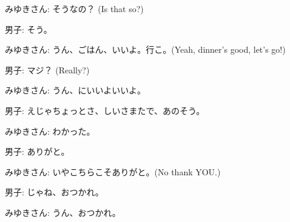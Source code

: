 \documentclass[../nihongo-gakushuu-kyouzai-grammar.tex]{subfiles}
\begin{document}
\begin{itemize}
    みゆきさん: そうなの？ (Is that so?)

    男子: そう。

    みゆきさん: うん、ごはん、いいよ。行こ。(Yeah, dinner's good, let's go!)

    男子: マジ？ (Really?)

    みゆきさん: うん、にいいよいいよ。

    男子: えじゃちょっとさ、しいさまたで、あのそう。

    みゆきさん: わかった。

    男子: ありがと。

    みゆきさん: いやこちらこそありがと。(No thank YOU.)

    男子: じゃね、おつかれ。

    みゆきさん: うん、おつかれ。
\end{itemize}
\end{document}
